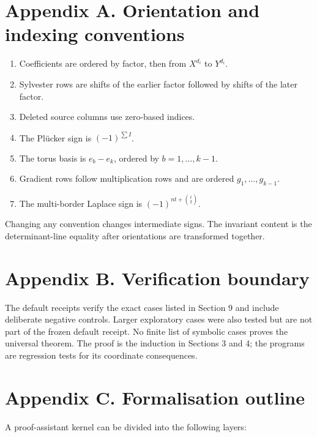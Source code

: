 \documentclass[
  11pt,
  a4paper,
]{article}
\providecommand{\tightlist}{%
  \setlength{\itemsep}{0pt}\setlength{\parskip}{0pt}}
\begin{document}
\section{Appendix A. Orientation and indexing
conventions}\label{appendix-a.-orientation-and-indexing-conventions}

\begin{enumerate}
\def\labelenumi{\arabic{enumi}.}
\tightlist
\item
  Coefficients are ordered by factor, then from \(X^{d_i}\) to
  \(Y^{d_i}\).
\item
  Sylvester rows are shifts of the earlier factor followed by shifts of
  the later factor.
\item
  Deleted source columns use zero-based indices.
\item
  The Plücker sign is \((-1)^{\sum I}\).
\item
  The torus basis is \(e_b-e_k\), ordered by \(b=1,\ldots,k-1\).
\item
  Gradient rows follow multiplication rows and are ordered
  \(g_1,\ldots,g_{k-1}\).
\item
  The multi-border Laplace sign is \((-1)^{nt+\binom t2}\).
\end{enumerate}

Changing any convention changes intermediate signs. The invariant
content is the determinant-line equality after orientations are
transformed together.

\section{Appendix B. Verification
boundary}\label{appendix-b.-verification-boundary}

The default receipts verify the exact cases listed in Section 9 and
include deliberate negative controls. Larger exploratory cases were also
tested but are not part of the frozen default receipt. No finite list of
symbolic cases proves the universal theorem. The proof is the induction
in Sections 3 and 4; the programs are regression tests for its
coordinate consequences.

\section{Appendix C. Formalisation
outline}\label{appendix-c.-formalisation-outline}

A proof-assistant kernel can be divided into the following layers:
\end{document}

